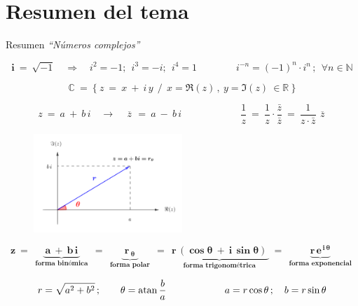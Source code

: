 \newpage %

\section{Resumen del tema}
\vspace{0.5cm}
\begin{myblock}{Resumen \emph{``Números complejos''}}

\vspace{2mm} $$\boldsymbol i\ = \ \sqrt{-1} \quad \Rightarrow \quad i^2=-1;\ \ i^3=-i;\ \ i^4=1 \qquad  \qquad  i^{-n}=(-1)^n \cdot i^n \,  ; \ \ \forall n \in \mathbb N$$

$$ \mathbb C \ = \ \{ \ z\ = \ x \ +\ i\, y \ \ / \ \ x=\Re(z)\, , \ y=\Im(z)\ \in \mathbb R \ \}$$

$$z\ = \ a \ + \ b \,  i \quad \to \quad \overline{\, z\, } \ = \ a \ - \ b\, i \qquad \qquad \qquad \dfrac 1 z \ = \ \dfrac 1 z \cdot \dfrac{\bar z}{\bar z} \ = \  \dfrac{1}{z\cdot \bar z} \ \overline{ \, z \, }$$

\begin{figure}[H]
	\centering
	\includegraphics[width=0.5\textwidth]{img-c/comp04.png}
\end{figure}



$$\boxed{\ 
\boldsymbol{z 
\ = \  
\underbrace {\ a \ + \ b\, i \ }_{\text{ forma binómica }} 
\ = \ 
\underbrace{\ r_{\ \theta} \ }_{\text{ forma polar }} 
\ = \ 
\underbrace{\ r\, (\cos \theta \ + \ i\, \sin \theta) \ }_{\text{ forma trigonométrica } } 
\ = \ 
\underbrace {r\, e^{\, i \, \theta} }_{ \text{ forma exponencial } }
} \ } $$

$$r=\sqrt{a^2+b^2}\, ; \qquad \theta=\atan \dfrac b a \qquad \qquad \qquad a=r\cos \theta\, ; \quad b=r\sin \theta$$


\end{myblock}
